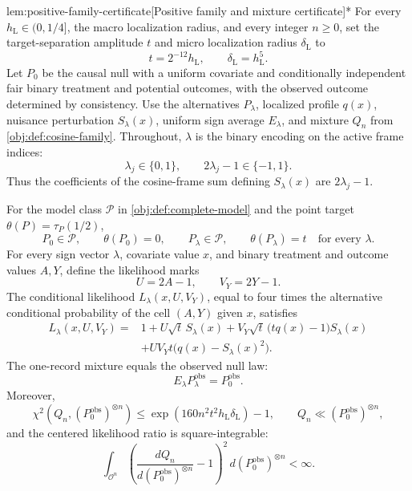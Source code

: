 \documentclass[11pt]{article}
\begin{document}
\begin{lemmav}{lem:positive-family-certificate}[Positive family and mixture certificate]*
For every \(h_{\mathrm L}\in(0,1/4]\), the macro localization radius, and every integer \(n\ge0\), set the target-separation amplitude \(t\) and micro localization radius \(\delta_{\mathrm L}\) to
\[
t=2^{-12}h_{\mathrm L},
\qquad
\delta_{\mathrm L}=h_{\mathrm L}^{5}.
\]
Let \(P_0\) be the causal null with a uniform covariate and conditionally independent fair binary treatment and potential outcomes, with the observed outcome determined by consistency. Use the alternatives \(P_\lambda\), localized profile \(q(x)\), nuisance perturbation \(S_\lambda(x)\), uniform sign average \(E_\lambda\), and mixture \(Q_n\) from \cref{obj:def:cosine-family}. Throughout, \(\lambda\) is the binary encoding on the active frame indices:
\[
\lambda_j\in\{0,1\},
\qquad
2\lambda_j-1\in\{-1,1\}.
\]
Thus the coefficients of the cosine-frame sum defining \(S_\lambda(x)\) are \(2\lambda_j-1\).

For the model class \(\mathcal P\) in \cref{obj:def:complete-model} and the point target \(\theta(P)=\tau_P(1/2)\),
\[
P_0\in\mathcal P,\qquad
\theta(P_0)=0,\qquad
P_\lambda\in\mathcal P,\qquad
\theta(P_\lambda)=t
\quad\text{for every }\lambda.
\]
For every sign vector \(\lambda\), covariate value \(x\), and binary treatment and outcome values \(A,Y\), define the likelihood marks
\[
U=2A-1,\qquad V_Y=2Y-1.
\]
The conditional likelihood \(L_\lambda(x,U,V_Y)\), equal to four times the alternative conditional probability of the cell \((A,Y)\) given \(x\), satisfies
\[
\begin{aligned}
L_\lambda(x,U,V_Y)
={}&1+U\sqrt t\,S_\lambda(x)
 +V_Y\sqrt t\,\bigl(tq(x)-1\bigr)S_\lambda(x)\\
&+UV_Yt\bigl(q(x)-S_\lambda(x)^2\bigr).
\end{aligned}
\]
The one-record mixture equals the observed null law:
\[
E_\lambda P_\lambda^{\mathrm{obs}}=P_0^{\mathrm{obs}}.
\]
Moreover,
\[
\chi^2\!\left(Q_n,(P_0^{\mathrm{obs}})^{\otimes n}\right)
\le
\exp\!\left(160n^2t^2h_{\mathrm L}\delta_{\mathrm L}\right)-1,
\qquad
Q_n\ll(P_0^{\mathrm{obs}})^{\otimes n},
\]
and the centered likelihood ratio is square-integrable:
\[
\int_{\mathcal O^n}
\left(
\frac{dQ_n}{d(P_0^{\mathrm{obs}})^{\otimes n}}-1
\right)^2
\,d(P_0^{\mathrm{obs}})^{\otimes n}
<\infty.
\]
\end{lemmav}
\end{document}
